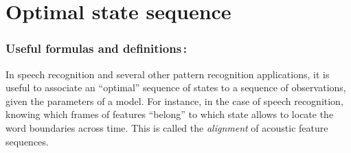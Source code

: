 \documentclass[twoside,a4paper,titlepage]{article}
\begin{document}
\pagebreak
\section{Optimal state sequence}
\label{sec:optimal}
\subsubsection*{Useful formulas and definitions\,:}
In speech recognition and several other pattern recognition applications,
it is useful to associate an ``optimal'' sequence of states to a sequence
of observations, given the parameters of a model. For instance, in the case
of speech recognition, knowing which frames of features ``belong'' to which
state allows to locate the word boundaries across time. This is called the
{\em alignment} of acoustic feature sequences.
\end{document}
